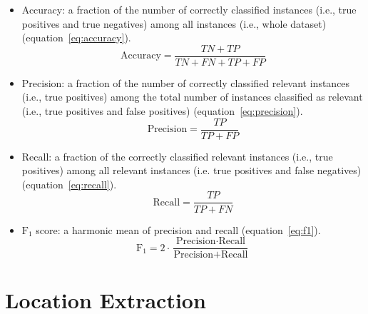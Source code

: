\begin{itemize}
  \item Accuracy: a fraction of the number of correctly classified instances (i.e., true positives
    and true negatives) among all instances (i.e., whole dataset) (equation~\ref{eq:accuracy}).
    \begin{equation}
      \text{Accuracy}=\frac{TN+TP}{TN+FN+TP+FP} 
      \label{eq:accuracy}
    \end{equation}
  \item Precision: a fraction of the number of correctly classified relevant instances (i.e., true
    positives) among the total number of instances classified as relevant (i.e., true positives and
    false positives) (equation~\ref{eq:precision}).
    \begin{equation}
      \text{Precision}=\frac{TP}{TP+FP} 
      \label{eq:precision}
    \end{equation}
  \item Recall: a fraction of the correctly classified relevant instances (i.e., true positives)
    among all relevant instances (i.e. true positives and false negatives) (equation~\ref{eq:recall}).
    \begin{equation}
      \text{Recall}=\frac{TP}{TP+FN} 
      \label{eq:recall}
    \end{equation}
  \item $\text{F}_1$ score: a harmonic mean of precision and recall (equation~\ref{eq:f1}).
    \begin{equation}
      \text{F}_1 =2\cdot\frac{\text{Precision}\cdot\text{Recall}}{\text{Precision}+\text{Recall}} 
      \label{eq:f1}
    \end{equation}
\end{itemize}


\section{Location Extraction}

